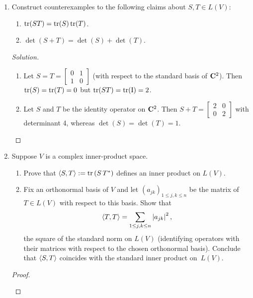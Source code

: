 \documentclass[11pt]{amsart}
\begin{document}
\begin{enumerate}[(1)]
\begin{proof}
\begin{enumerate}
\end{enumerate}
\end{proof}

\item Construct counterexamples to the following claims about $S, T \in L(V)$:
  \begin{enumerate}
  \item $\operatorname{tr}(ST) = \operatorname{tr}(S) \operatorname{tr}(T)$.
  \item $\det(S+T) = \det(S) + \det(T)$.
  \end{enumerate}

\begin{proof}[Solution]
\begin{enumerate}

\item Let $S = T = \begin{bmatrix} 0&1\\ 1&0 \end{bmatrix}$ (with respect to the standard basis of $\mathbf{C}^2$). Then $\operatorname{tr}(S) = \operatorname{tr}(T) = 0$ but $\operatorname{tr}(ST) = \operatorname{tr}(\mathrm I) = 2$.

\item Let $S$ and $T$ be the identity operator on $\mathbf{C}^2$. Then $S+T = \begin{bmatrix} 2&0\\ 0&2 \end{bmatrix}$ with determinant 4, whereas $\det(S) = \det(T) = 1$. \qedhere

\end{enumerate}
\end{proof}

\item Suppose $V$ is a complex inner-product space.
  \begin{enumerate}
  \item Prove that $\left< S, T \right> := \operatorname{tr} \left( S \, T^* \right)$ defines an inner product on $L(V)$.
  \item Fix an orthonormal basis of $V$ and let $\left( a_{ jk } \right)_{ 1 \le j, k \le n }$ be the matrix of $T \in L(V)$ with respect to this basis. Show that
  \[
    \left< T, T \right> = \sum_{ 1 \le j, k \le n } \left| a_{ jk } \right|^2 ,
  \]
  the square of the standard norm on $L(V)$ (identifying operators with their matrices with respect to the chosen orthonormal basis).
  Conclude that $\left< S, T \right>$ coincides with the standard inner product on~$L(V)$.
  \end{enumerate}

\begin{proof}
\begin{enumerate}


\end{enumerate}
\end{proof}
\end{enumerate}
\end{document}
